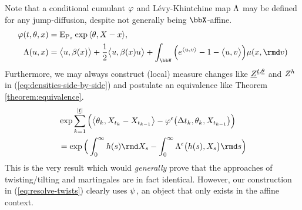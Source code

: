 \begin{remark}
  Note that a conditional cumulant $\varphi$ and L\'evy-Khintchine map $\Lambda$ may be defined for any jump-diffusion, despite not generally being $\stateSpace$-affine.
  \begin{align*}
    \affShift(t, \twistVar, \stateVar) &= \Exp_{\Prb_\stateVar}\exp\prj{\twistVar}{\X-\stateVar}, \\
    \ode(\momentVar, \stateVar) &= \bprj{\momentVar}{\affDrift(\stateVar)} + \frac12\bprj{\momentVar}{\affDrift(\stateVar)\momentVar} + \int_\vecSpace \Big( e^\prj{\momentVar}{\markVar} - 1 - \bprj{\momentVar}{\markVar} \Big) \affJump(\stateVar, \rmd\markVar)
  \end{align*}
  Furthermore, we may always construct (local) measure changes like $\underline{Z}^{\underline t, \underline{\theta}}$ and $Z^{h}$ in (\ref{eq:densities-side-by-side}) and postulate an equivalence like Theorem \ref{theorem:equivalence}.
  \begin{align*}
    &\exp \sum_{k=1}^{|\underline t|}\Big( \bprj{\twistVar_k}{\X_{t_k}-\X_{t_{k-1}}} - \affShift^\epsilon\big(\Delta t_k, \twistVar_k, \X_{t_{k-1}} \big) \Big)  \\
    &= \exp\Big( \int_0^\infty \twistFunc(s) \rmd \X_s - \int_0^\infty \ode^\epsilon\big(\twistFunc(s), \X_s\big) \rmd s \Big)
  \end{align*}
  This is the very result which would \emph{generally} prove that the approaches of twisting/tilting and martingales are in fact identical.
  However, our construction in (\ref{eq:resolve-twists}) clearly uses $\psi$, an object that only exists in the affine context.
\end{remark}
